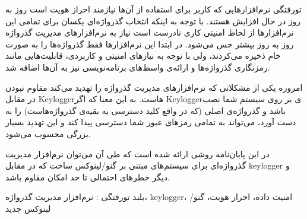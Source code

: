 


\pagestyle{empty}

‌تورفتگی
نرم‌افزارهایی که کاربر برای استفاده از آن‌ها نیازمند احراز هویت است روز به روز در حال افزایش هستند. با توجه به اینکه انتخاب گذرواژه‌ای یکسان برای تمامی این نرم‌افزارها از لحاظ امنیتی کاری نادرست است نیاز به نرم‌افزارهای مدیریت گذرواژه روز به روز بیشتر حس می‌شود. در ابتدا این نرم‌افزارها فقط گذرواژه‌ها را به صورت خام ذخیره می‌کردند، ولی با توجه به نیازهای امنیتی و کاربردی، قابلیت‌هایی مانند رمزنگاری گذرواژه‌ها و ارائه‌ی واسط‌های برنامه‌نویسی نیز به آن‌ها اضافه شد.

امروزه یکی از مشکلاتی که نرم‌افزارهای مدیریت گذرواژه را تهدید می‌کند مقاوم نبودن در مقابل Keyloggerهاست. به این معنا که اگر Keyloggerی بر روی سیستم شما نصب باشد و گذرواژه‌ی اصلی (که در واقع کلید دسترسی به بقیه‌ی گذرواژ‌ه‌هاست) را به دست آورد، می‌تواند به تمامی رمز‌های عبور شما دسترسی پیدا کند و این تهدید بسیار بزرگی محسوب می‌شود.
 
در این پایان‌نامه روشی ارائه شده است که طی آن می‌توان نرم‌افزار مدیریت گذرواژه‌ای برای سیستم‌های مبتنی بر گنو/لینوکس ساخت که در مقابل keylogger و دیگر خطر‌های احتمالی تا حد امکان مقاوم باشد.
 
‌بلند
‌تورفتگی : 
نرم‌افزار مدیریت گذرواژه، keylogger، امنیت داده، احراز هویت، گنو/لینوکس
‌جدید
